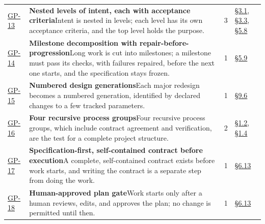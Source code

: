 \begin{longtable}{@{}p{} p{} r p{}@{}}
\hyperlink{gp-13}{GP-13}\hypertarget{gp-13}{} & \textbf{Nested levels of intent, each with acceptance criteria}\newline Intent is nested in levels; each level has its own acceptance criteria, and the top level holds the purpose.\rule[-\normalbaselineskip]{0pt}{0pt} & 3 & \hyperlink{nss-3.1}{\S3.1}, \hyperlink{nss-3.3}{\S3.3}, \hyperlink{nss-5.8}{\S5.8}\rule[-\normalbaselineskip]{0pt}{0pt} \\
\hyperlink{gp-14}{GP-14}\hypertarget{gp-14}{} & \textbf{Milestone decomposition with repair-before-progression}\newline Long work is cut into milestones; a milestone must pass its checks, with failures repaired, before the next one starts, and the specification stays frozen.\rule[-\normalbaselineskip]{0pt}{0pt} & 1 & \hyperlink{nss-5.9}{\S5.9}\rule[-\normalbaselineskip]{0pt}{0pt} \\
\hyperlink{gp-15}{GP-15}\hypertarget{gp-15}{} & \textbf{Numbered design generations}\newline Each major redesign becomes a numbered generation, identified by declared changes to a few tracked parameters.\rule[-\normalbaselineskip]{0pt}{0pt} & 1 & \hyperlink{nss-9.6}{\S9.6}\rule[-\normalbaselineskip]{0pt}{0pt} \\
\hyperlink{gp-16}{GP-16}\hypertarget{gp-16}{} & \textbf{Four recursive process groups}\newline Four recursive process groups, which include contract agreement and verification, are the test for a complete project structure.\rule[-\normalbaselineskip]{0pt}{0pt} & 2 & \hyperlink{nss-1.2}{\S1.2}, \hyperlink{nss-1.4}{\S1.4}\rule[-\normalbaselineskip]{0pt}{0pt} \\
\hyperlink{gp-17}{GP-17}\hypertarget{gp-17}{} & \textbf{Specification-first, self-contained contract before execution}\newline A complete, self-contained contract exists before work starts, and writing the contract is a separate step from doing the work.\rule[-\normalbaselineskip]{0pt}{0pt} & 1 & \hyperlink{nss-6.13}{\S6.13}\rule[-\normalbaselineskip]{0pt}{0pt} \\
\hyperlink{gp-18}{GP-18}\hypertarget{gp-18}{} & \textbf{Human-approved plan gate}\newline Work starts only after a human reviews, edits, and approves the plan; no change is permitted until then.\rule[-\normalbaselineskip]{0pt}{0pt} & 1 & \hyperlink{nss-6.13}{\S6.13}\rule[-\normalbaselineskip]{0pt}{0pt} \\

\end{longtable}
